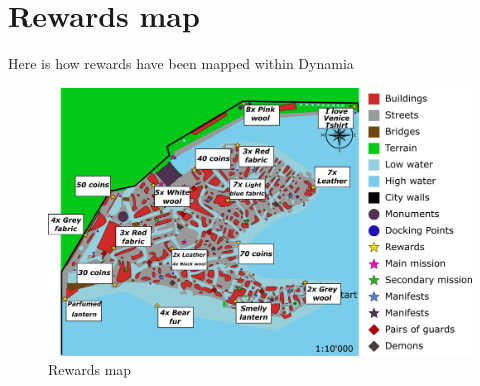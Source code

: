 \section{Rewards map}
Here is how rewards have been mapped within Dynamia
\begin{figure}[H]
  \centering
  \includegraphics[width=\textwidth]{Images/Maps/dynamiaRewardsMapping}
  \caption{Rewards map}
\end{figure}
\hspace{0pt} \\ %
